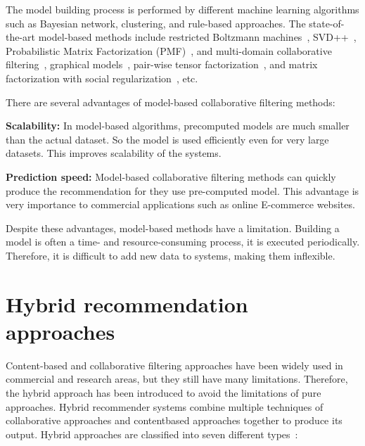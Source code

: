 \documentclass[oneside,13pt]{extreport}
\begin{document}
The model building process is performed by different machine learning algorithms such as Bayesian network, clustering, and rule-based approaches. The state-of-the-art model-based methods include restricted
Boltzmann machines~\cite{Salakhutdinov07}, SVD++~\cite{KorenMatrix}, Probabilistic Matrix Factorization (PMF)~\cite{SalakhutdinovMF07}, and multi-domain collaborative filtering~\cite{Zhang10}, graphical models~\cite{Jin03}, pair-wise tensor factorization~\cite{Rendle10}, and matrix factorization with social regularization~\cite{Ma11}, etc.

There are several advantages of model-based collaborative filtering methods:
\begin{description}
    \item{\textbf{Scalability:}} In model-based algorithms, precomputed models are much smaller than the actual dataset. So the model is used efficiently even for very large datasets. This improves scalability of the systems. 
    \item{\textbf{Prediction speed:}} Model-based collaborative filtering methods can quickly produce the recommendation for they use pre-computed model. This advantage is very importance to commercial applications such as online E-commerce websites.
\end{description}

Despite these advantages, model-based methods have a limitation. Building a model is often a time- and resource-consuming process, it is executed periodically. Therefore, it is difficult to add new data to systems, making them inflexible.

\section{Hybrid recommendation approaches}
Content-based and collaborative filtering approaches have been widely used in commercial and research areas, but they still have many limitations. Therefore, the hybrid approach has been introduced to avoid the limitations of pure approaches. Hybrid recommender systems combine multiple techniques of collaborative approaches and contentbased approaches together to produce its output. Hybrid approaches are classified into seven different types~\cite{Burke07}:
\end{document}

